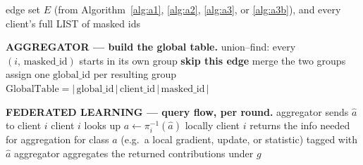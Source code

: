 \documentclass[11pt]{article}
\begin{document}
\begin{algorithm}[t]
\caption{Global-id table and FL query flow (shared by all variants above)}
\label{alg:gid}
\small
\begin{algorithmic}[1]
\Require edge set $E$ (from Algorithm~\ref{alg:a1}, \ref{alg:a2}, \ref{alg:a3},
         or \ref{alg:a3b}), and every client's full LIST of masked ids

\Statex \textbf{AGGREGATOR --- build the global table.}
\State union--find: every $(i,\, \mathrm{masked\_id})$ starts in its own group
    \State \textbf{skip this edge}
  \Else
    \State merge the two groups
  \EndIf
\EndFor
\State assign one $\mathrm{global\_id}$ per resulting group
\State \Return $\mathrm{GlobalTable} = \big|\,\mathrm{global\_id}\,\big|\,
       \mathrm{client\_id}\,\big|\,\mathrm{masked\_id}\,\big|$

\Statex \hrulefill
\Statex \textbf{FEDERATED LEARNING --- query flow, per round.}
    \State aggregator sends $\hat a$ to client $i$
    \State client $i$ looks up $a \gets \pi_i^{-1}(\hat a)$ locally
    \State client $i$ returns the info needed for aggregation for class $a$
      (e.g.\ a local gradient, update, or statistic) tagged with $\hat a$
  \EndFor
  \State aggregator aggregates the returned contributions under $g$
\EndFor
\end{algorithmic}
\end{algorithm}
\end{document}
